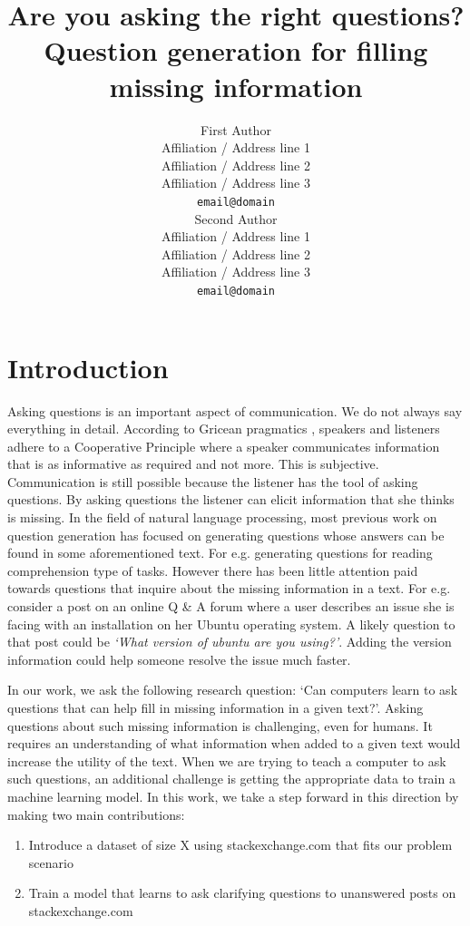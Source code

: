 \documentclass[11pt]{article}
\title{Are you asking the right questions? \\ Question generation for filling missing information}
\author{First Author \\
  Affiliation / Address line 1 \\
  Affiliation / Address line 2 \\
  Affiliation / Address line 3 \\
  {\tt email@domain} \\\And
  Second Author \\
  Affiliation / Address line 1 \\
  Affiliation / Address line 2 \\
  Affiliation / Address line 3 \\
  {\tt email@domain} \\}
\date{}
\begin{document}
\maketitle
\begin{abstract}

\end{abstract}
\section{Introduction}

Asking questions is an important aspect of communication. We do not always say everything in detail. According to Gricean pragmatics \cite{}, speakers and listeners adhere to a Cooperative Principle where a speaker communicates information that is as informative as required and not more. This is subjective. Communication is still possible because the listener has the tool of asking questions. By asking questions the listener can elicit information that she thinks is missing. In the field of natural language processing, most previous work on question generation has focused on generating questions whose answers can be found in some aforementioned text. For e.g. generating questions for reading comprehension type of tasks. However there has been little attention paid towards questions that inquire about the missing information in a text. For e.g. consider a post on an online Q \& A forum where a user describes an issue she is facing with an installation on her Ubuntu operating system. A likely question to that post could be \textit{`What version of ubuntu are you using?'}.  Adding the version information could help someone resolve the issue much faster. 

In our work, we ask the following research question: `Can computers learn to ask questions that can help fill in missing information in a given text?'. Asking questions about such missing information is challenging, even for humans. It requires an understanding of what information when added to a given text would increase the utility of the text. When we are trying to teach a computer to ask such questions, an additional challenge is getting the appropriate data to train a machine learning model. In this work, we take a step forward in this direction by making two main contributions:
\begin{enumerate}
\item Introduce a dataset of size X using stackexchange.com that fits our problem scenario
\item Train a model that learns to ask clarifying questions to unanswered posts on stackexchange.com
\end{enumerate}
\end{document}
